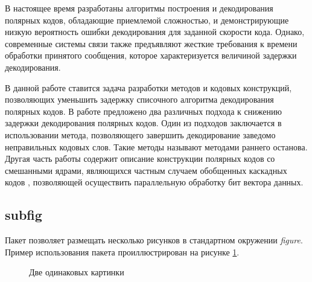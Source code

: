\begin{multicols}{3}
В настоящее время разработаны алгоритмы построения и декодирования полярных кодов, обладающие приемлемой сложностью, и демонстрирующие низкую вероятность ошибки декодирования для заданной скорости кода.
Однако, современные системы связи также предъявляют жесткие требования к времени обработки принятого сообщения, которое характеризуется величиной задержки декодирования.

В данной работе ставится задача разработки методов и кодовых конструкций, позволяющих уменьшить задержку списочного алгоритма декодирования полярных кодов.
В работе предложено два различных подхода к снижению задержки декодирования полярных кодов.
Один из подходов заключается в использовании метода, позволяющего завершить декодирование заведомо неправильных кодовых слов. 
Такие методы называют методами раннего останова.
Другая часть работы содержит описание конструкции полярных кодов со смешанными ядрами, являющихся частным случаем обобщенных каскадных кодов \cite{zinoviev1976generalized}, позволяющей осуществить параллельную обработку бит вектора данных.
\end{multicols}

\subsection{subfig}
Пакет позволяет размещать несколько рисунков в стандартном окружении {\em figure}.
Пример использования пакета проиллюстрирован на рисунке \ref{2figs}.

\begin{figure}[b]
  \centering
  \qquad
  \caption{Две одинаковых картинки}
  \label{2figs}
\end{figure}

